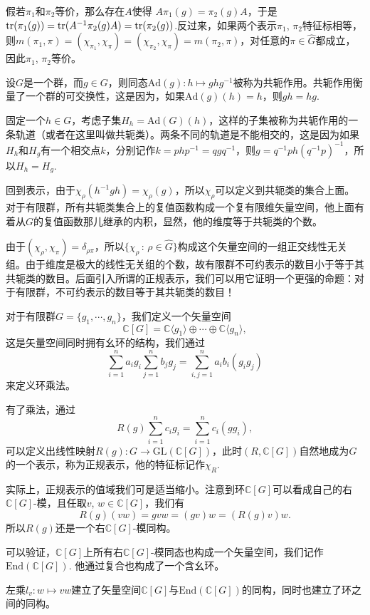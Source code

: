 \documentclass[11pt]{article}
\theoremstyle{definition}
\theoremstyle{plain}
\newcommand{\cc}{\mathbb{C}}
\begin{document}
\proof 假若$\pi_1$和$\pi_2$等价，那么存在$A$使得
$A\pi_1(g)=\pi_2(g)A$，于是$\operatorname{tr}(\pi_1(g))=\operatorname{tr}(A^{-1}\pi_2(g)A)=\operatorname{tr}(\pi_2(g))$.反过来，如果两个表示$\pi_1$, $\pi_2$特征标相等，则$	m(\pi_1,\pi)=(\chi_{\pi_1},\chi_\pi)=(\chi_{\pi_2},\chi_\pi)=m(\pi_2,\pi)$，对任意的$\pi\in\hat{G}$都成立，因此$\pi_1$, $\pi_2$等价。\endproof

\para 设$G$是一个群，而$g\in G$，则同态$\mathrm{Ad}(g):h\mapsto ghg^{-1}$被称为共轭作用。共轭作用衡量了一个群的可交换性，这是因为，如果$\mathrm{Ad}(g)(h)=h$，则$gh=hg$.

固定一个$h\in G$，考虑子集$H_h=\mathrm{Ad}(G)(h)$，这样的子集被称为共轭作用的一条轨道（或者在这里叫做共轭类）。两条不同的轨道是不能相交的，这是因为如果$H_h$和$H_g$有一个相交点$k$，分别记作$k=php^{-1}=qgq^{-1}$，则$g=q^{-1}ph(q^{-1}p)^{-1}$，所以$H_h=H_g$.

\para 回到表示，由于$\chi_\rho(h^{-1}gh)= \chi_\rho(g)$，所以$\chi_\rho$可以定义到共轭类的集合上面。对于有限群，所有共轭类集合上的复值函数构成一个复有限维矢量空间，他上面有着从$G$的复值函数那儿继承的内积，显然，他的维度等于共轭类的个数。

由于$(\chi_\rho,\chi_\pi)=\delta_{\rho\pi}$，所以$\{\chi_\rho\,:\, \rho\in \hat{G}\}$构成这个矢量空间的一组正交线性无关组。由于维度是极大的线性无关组的个数，故有限群不可约表示的数目小于等于其共轭类的数目。后面引入所谓的正规表示，我们可以用它证明一个更强的命题：对于有限群，不可约表示的数目等于其共轭类的数目！

\para 对于有限群$G=\{g_1,\cdots,g_n\}$，我们定义一个矢量空间
\[
	\cc [G]=\cc\langle g_1\rangle \oplus \cdots \oplus \cc\langle g_n\rangle,
\]
这是矢量空间同时拥有幺环的结构，我们通过
\[
\sum_{i=1}^n a_i g_i\sum_{j=1}^n b_j g_j=\sum_{i,j=1}^n a_ib_i(g_ig_j)
\]
来定义环乘法。

有了乘法，通过
\[
	R(g)\sum_{i=1}^n c_i g_i=\sum_{i=1}^n c_i(gg_i),
\]
可以定义出线性映射$R(g):G\to \mathrm{GL}(\cc [G])$，此时$(R,\cc [G])$自然地成为$G$的一个表示，称为正规表示，他的特征标记作$\chi_R$. 

实际上，正规表示的值域我们可是适当缩小。注意到环$\cc [G]$可以看成自己的右$\cc [G]$-模，且任取$v$, $w\in \cc [G]$，我们有
\[
	R(g)(vw)=gvw=(gv)w=(R(g)v)w.
\]
所以$R(g)$还是一个右$\cc [G]$-模同构。

可以验证，$\cc [G]$上所有右$\cc [G]$-模同态也构成一个矢量空间，我们记作$\mathrm{End}(\cc [G])$. 他通过复合也构成了一个含幺环。

{\pro 左乘$l_v:w\mapsto vw$建立了矢量空间$\cc [G]$与$\mathrm{End}(\cc [G])$的同构，同时也建立了环之间的同构。\endpro}
\end{document}
